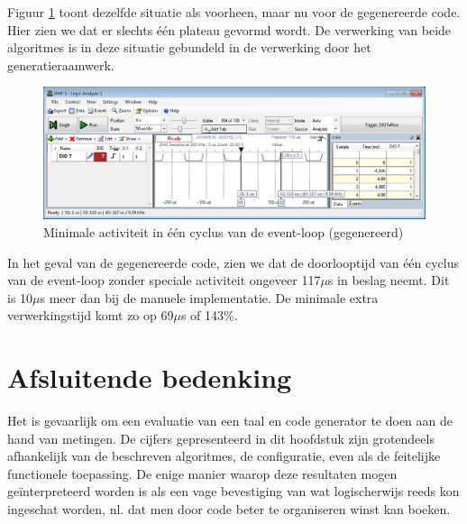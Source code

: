 Figuur \ref{fig:logic-analyser-generated} toont dezelfde situatie als voorheen,
maar nu voor de gegenereerde code. Hier zien we dat er slechts \'e\'en plateau
gevormd wordt. De verwerking van beide algoritmes is in deze situatie gebundeld
in de verwerking door het generatieraamwerk.

\begin{figure}[ht]
  \centering
  \includegraphics[width=\linewidth]{../src/demo/idle-event-loop-both-generated.png}
  \caption{Minimale activiteit in \'e\'en cyclus van de event-loop (gegenereerd)}
  \label{fig:logic-analyser-generated}
\end{figure}

\vspace{-4mm}

In het geval van de gegenereerde code, zien we dat de doorlooptijd van \'e\'en
cyclus van de event-loop zonder speciale activiteit ongeveer 117$\mu$s in
beslag neemt. Dit is 10$\mu$s meer dan bij de manuele implementatie. De
minimale extra verwerkingstijd komt zo op 69$\mu$s of 143\%.

\vspace{-4mm}

\section{Afsluitende bedenking}

Het is gevaarlijk om een evaluatie van een taal en code generator te doen aan
de hand van metingen. De cijfers gepresenteerd in dit hoofdstuk zijn
grotendeels afhankelijk van de beschreven algoritmes, de configuratie, even als
de feitelijke functionele toepassing. De enige manier waarop deze resultaten
mogen ge\"interpreteerd worden is als een vage bevestiging van wat
logischerwijs reeds kon ingeschat worden, nl. dat men door code beter te
organiseren winst kan boeken.
